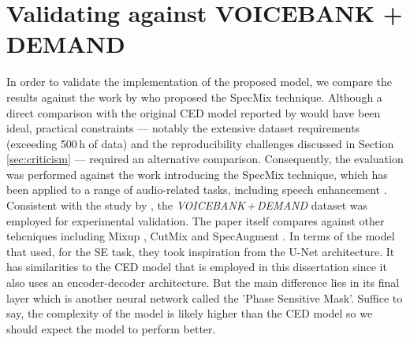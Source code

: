 \documentclass[logo,bsc,singlespacing,parskip,online]{infthesis}
\newcommand{\vbd}{\textit{VOICEBANK\,+\,DEMAND}\xspace}
\begin{document}
\section{Validating against VOICEBANK + DEMAND}
In order to validate the implementation of the proposed model, we compare the results 
against the work by \citet{kim_specmix_2021} who proposed the SpecMix technique. 
Although a direct comparison with the original CED model reported by \citet{tan18_interspeech} 
would have been ideal, practical constraints — notably the extensive dataset requirements 
(exceeding 500\,h of data) and the reproducibility challenges discussed in Section \ref{sec:criticism} — 
required an alternative comparison. Consequently, the evaluation was performed against the work 
introducing the SpecMix technique, which has been applied to a range of audio-related 
tasks, including speech enhancement \citep{kim_specmix_2021}. Consistent with the study 
by \citet{kim_specmix_2021}, the \vbd dataset was employed for experimental 
validation. The paper itself compares against other tehcniques including Mixup \citep{zhang_mixup_2017},
CutMix \citep{yun_cutmix_2019} and SpecAugment \citep{park_specaugment_2019}. In terms 
of the model that \citet{kim_specmix_2021} used, for the SE task, they 
took inspiration from the U-Net \citep{ronneberger_unet_2015} architecture.
It has similarities to the CED model that is employed in this dissertation 
since it also uses an encoder-decoder architecture. But the main difference 
lies in its final layer which is another neural network called the 
'Phase Sensitive Mask'. Suffice to say, the complexity of the model 
is likely higher than the CED model so we should expect the model 
to perform better.
\end{document}
